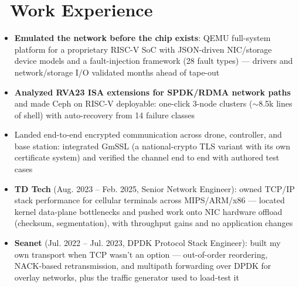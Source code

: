 \documentclass{resume}
\begin{document}
\section{\faBriefcase\ Work Experience}
\begin{singlespacing}
\begin{itemize}
    \item \textbf{Emulated the network before the chip exists}: QEMU full-system platform for a proprietary RISC-V SoC with JSON-driven NIC/storage device models and a fault-injection framework (28 fault types) --- drivers and network/storage I/O validated months ahead of tape-out
    \item \textbf{Analyzed RVA23 ISA extensions for SPDK/RDMA network paths} and made Ceph on RISC-V deployable: one-click 3-node clusters ($\sim$8.5k lines of shell) with auto-recovery from 14 failure classes
\end{itemize}
\end{singlespacing}

\begin{singlespacing}
\begin{itemize}
    \item Landed end-to-end encrypted communication across drone, controller, and base station: integrated GmSSL (a national-crypto TLS variant with its own certificate system) and verified the channel end to end with authored test cases
\end{itemize}
\end{singlespacing}

\begin{singlespacing}
\begin{itemize}
    \item \textbf{TD Tech} (Aug. 2023 -- Feb. 2025, Senior Network Engineer): owned TCP/IP stack performance for cellular terminals across MIPS/ARM/x86 --- located kernel data-plane bottlenecks and pushed work onto NIC hardware offload (checksum, segmentation), with throughput gains and no application changes
    \item \textbf{Seanet} (Jul. 2022 -- Jul. 2023, DPDK Protocol Stack Engineer): built my own transport when TCP wasn't an option --- out-of-order reordering, NACK-based retransmission, and multipath forwarding over DPDK for overlay networks, plus the traffic generator used to load-test it
\end{itemize}
\end{singlespacing}
\end{document}
